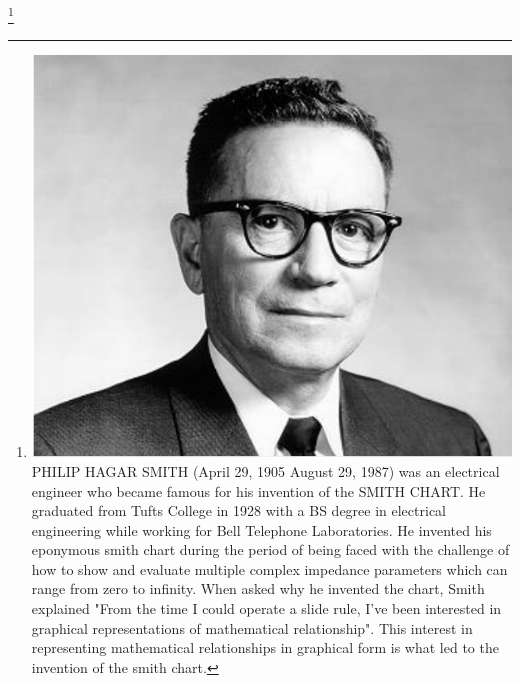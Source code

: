 \footnote{\includegraphics[scale=0.09]{./graphics/a21}PHILIP HAGAR SMITH (April 29, 1905  August 29, 1987) was an electrical engineer who became famous for his invention of the SMITH CHART. He graduated from Tufts College in 1928 with a BS degree in electrical engineering while working for Bell Telephone Laboratories. He invented his eponymous smith chart during the period of being faced with the challenge of how to show and evaluate multiple complex impedance parameters which can range from zero to infinity. When asked why he invented the chart, Smith explained "From the time I could operate a slide rule, I've been interested in graphical representations of mathematical relationship". This interest in representing mathematical relationships in graphical form is what led to the invention of the smith chart.}

